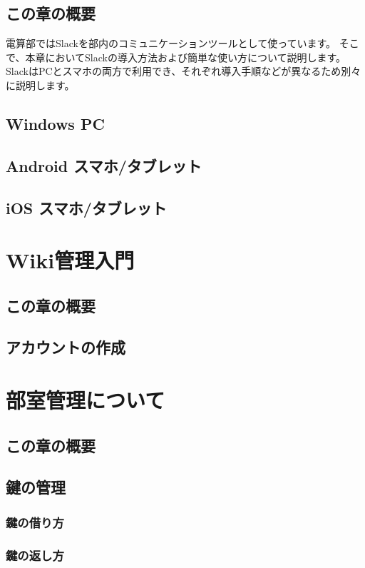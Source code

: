\documentclass[lualatex,ja=standard,12pt,a4j]{bxjsbook}
\begin{document}
		\section{この章の概要}
			電算部ではSlackを部内のコミュニケーションツールとして使っています。
            そこで、本章においてSlackの導入方法および簡単な使い方について説明します。
            SlackはPCとスマホの両方で利用でき、それぞれ導入手順などが異なるため別々に説明します。
		\section{Windows PC}
		\section{Android スマホ/タブレット}
		\section{iOS スマホ/タブレット}
	\chapter{Wiki管理入門}
		\section{この章の概要}
		\section{アカウントの作成}
	\chapter{部室管理について}
		\section{この章の概要}
		\section{鍵の管理}
		\subsection{鍵の借り方}
		\subsection{鍵の返し方}
\end{document}

